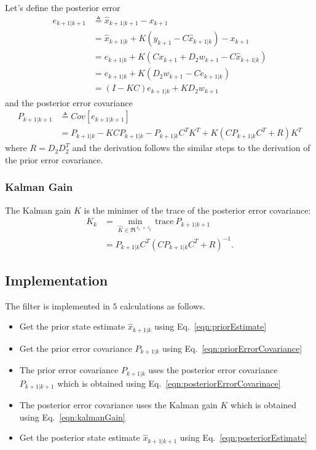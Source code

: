 Let's define the posterior error
\begin{align}
    e_{k+1|k+1} &\triangleq \hat{x}_{k+1|k+1} - x_{k+1} \\
    &= \hat{x}_{k+1|k} + K (y_{k+1} - C \hat{x}_{k+1|k}) - x_{k+1} \\
    &= e_{k+1|k} + K (C x_{k+1} + D_2 w_{k+1} - C \hat{x}_{k+1|k}) \\
    &= e_{k+1|k} + K(D_2 w_{k+1} - C e_{k+1|k}) \\
    &= (I - KC) e_{k+1|k} + K D_2 w_{k+1}
\end{align}
and the posterior error covariance
\begin{align}
    P_{k+1|k+1} &\triangleq Cov[e_{k+1|k+1}] \\
    &= P_{k+1|k} - KCP_{k+1|k} - P_{k+1|k}C^T K^T + K(CP_{k+1|k} C^T +R)K^T \label{eqn:posteriorErrorCovarinace}
\end{align}
where $R = D_2 D_2^T$ and the derivation follows the similar steps to the derivation of the prior error covariance.

\subsubsection{Kalman Gain}
\hspace{\parindent}The Kalman gain $K$ is the minimer of the trace of the posterior error covariance:
\begin{align}
    K_k &= \min_{\hat{K} \in\Re^{\ell_x \times \ell_y}} \text{trace} \: P_{k+1|k+1} \\
    &= P_{k+1|k} C^T (C P_{k+1|k} C^T + R)^{-1}.
    \label{eqn:kalmanGain}
\end{align}

\subsection{Implementation}
\hspace{\parindent}The filter is implemented in $5$ calculations as follows.
\begin{itemize}
    \item Get the prior state estimate $\hat{x}_{k+1|k}$ using Eq.~\ref{eqn:priorEstimate}
    \item Get the prior error covariance $P_{k+1|k}$ using Eq.~\ref{eqn:priorErrorCovariance}
    \item The prior error covariance $P_{k+1|k}$ uses the posterior error covariance $P_{k+1|k+1}$ which is obtained using Eq.~\ref{eqn:posteriorErrorCovarinace}
    \item The posterior error covariance uses the Kalman gain $K$ which is obtained using Eq.~\ref{eqn:kalmanGain}
    \item Get the posterior state estimate $\hat{x}_{k+1|k+1}$ using Eq.~\ref{eqn:posteriorEstimate}
\end{itemize}

